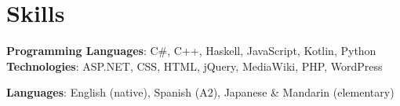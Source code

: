 \section{Skills}
\begin{itemize}[leftmargin=0.15in, label={}]
\small{\item{
    \textbf{Programming Languages}{: C\#, C++, Haskell, JavaScript, Kotlin, Python} \\
    \textbf{Technologies}{: ASP.NET, CSS, HTML, jQuery, MediaWiki, PHP, WordPress} \\
}}
\small{\item{
    \textbf{Languages}{: English (native), Spanish (A2), Japanese \& Mandarin (elementary)} \\
}}
\end{itemize}